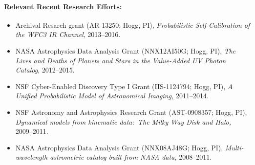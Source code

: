 \documentclass[12pt]{article}
\begin{document}
\paragraph{Relevant Recent Research Efforts:}
\begin{itemize}\setlength{\itemsep}{0pt}
\item
{} Archival Resarch grant (AR-13250; Hogg, PI),
\textit{Probabilistic Self-Calibration of the WFC3 IR Channel},
2013--2016.
\item
NASA Astrophysics Data Analysis Grant (NNX12AI50G; Hogg, PI),
\textit{The Lives and Deaths of Planets and Stars in the Value-Added UV Photon Catalog},
2012--2015.
\item
NSF Cyber-Enabled Discovery Type I Grant (IIS-1124794; Hogg, PI),
\textit{A Unified Probabilistic Model of Astronomical Imaging,}
2011--2014.
\item
NSF Astronomy and Astrophysics Research Grant (AST-0908357; Hogg, PI),
\textit{Dynamical models from kinematic data:\ The Milky Way Disk and Halo,}
2009--2011.
\item
NASA Astrophysics Data Analysis Grant (NNX08AJ48G; Hogg, PI),
\textit{Multi-wavelength astrometric catalog built from NASA data,}
2008--2011.
\end{itemize}
\end{document}
